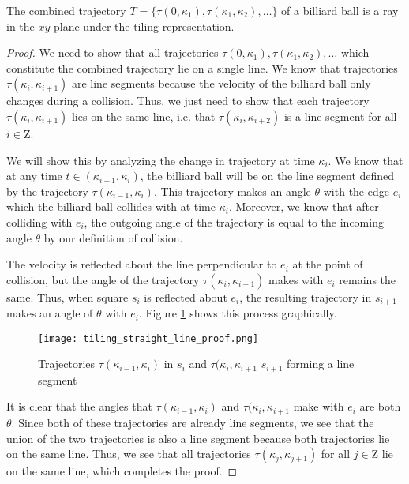 \begin{theorem}
  The combined trajectory $T = \{\tau(0, \kappa_1), \tau(\kappa_1, \kappa_2), \ldots\}$ of a billiard ball is a ray in the $xy$ plane under the tiling representation.
  \label{theorem:straight-line}
\end{theorem}
\begin{proof}
  We need to show that all trajectories $\tau(0, \kappa_1), \tau(\kappa_1, \kappa_2), \ldots$ which constitute the combined trajectory lie on a single line. We know that trajectories $\tau(\kappa_i, \kappa_{i+1})$ are line segments because the velocity of the billiard ball only changes during a collision. Thus, we just need to show that each trajectory $\tau(\kappa_i, \kappa_{i+1})$ lies on the same line, i.e. that $\tau(\kappa_i, \kappa_{i+2})$ is a line segment for all $i \in \mathrm{Z}$.

  We will show this by analyzing the change in trajectory at time $\kappa_i$. We know that at any time $t \in (\kappa_{i-1}, \kappa_i)$, the billiard ball will be on the line segment defined by the trajectory $\tau(\kappa_{i-1}, \kappa_i)$. This trajectory makes an angle $\theta$ with the edge $e_i$ which the billiard ball collides with at time $\kappa_i$. Moreover, we know that after colliding with $e_i$, the outgoing angle of the trajectory is equal to the incoming angle $\theta$ by our definition of collision.

The velocity is reflected about the line perpendicular to $e_i$ at the point of collision, but the angle of the trajectory $\tau(\kappa_i, \kappa_{i+1})$ makes with $e_i$ remains the same. Thus, when square $s_{i}$ is reflected about $e_i$, the resulting trajectory in $s_{i+1}$ makes an angle of $\theta$ with $e_i$. Figure \ref{fig:straight-line-angle} shows this process graphically.

\begin{figure}
  \texttt{[image: tiling\_straight\_line\_proof.png]}
  \caption{\label{fig:straight-line-angle}Trajectories $\tau(\kappa_{i-1}, \kappa_i)$ in $s_i$ and $\tau(\kappa_{i}, \kappa_{i+1}$ $s_{i+1}$ forming a line segment}
\end{figure}

It is clear that the angles that $\tau(\kappa_{i-1}, \kappa_i)$ and $\tau(\kappa_{i}, \kappa_{i+1}$ make with $e_i$ are both $\theta$. Since both of these trajectories are already line segments, we see that the union of the two trajectories is also a line segment because both trajectories lie on the same line. Thus, we see that all trajectories $\tau(\kappa_j, \kappa_{j+1})$ for all $j \in \mathrm{Z}$ lie on the same line, which completes the proof.
\end{proof}

